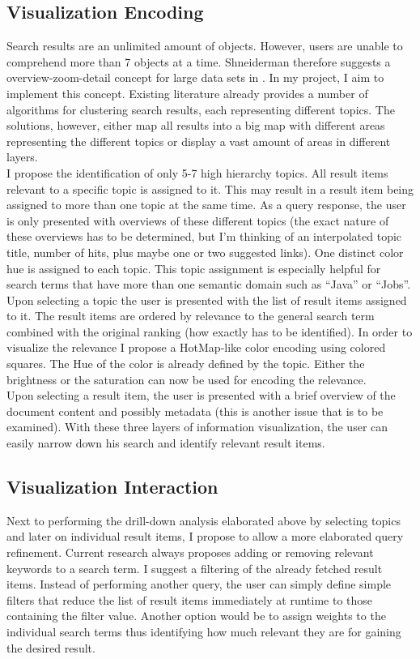 \subsection{Visualization Encoding}
Search results are an unlimited amount of objects. However, users are unable to comprehend more than 7 objects at a time. Shneiderman therefore suggests a overview-zoom-detail concept for large data sets in \cite{Shneiderman1996}. In my project, I aim to implement this concept. Existing literature already provides a number of algorithms for clustering search results, each representing different topics. The solutions, however, either map all results into a big map with different areas representing the different topics or display a vast amount of areas in different layers. \\
I propose the identification of only 5-7 high hierarchy topics. All result items relevant to a specific topic is assigned to it. This may result in a result item being assigned to more than one topic at the same time. As a query response, the user is only presented with overviews of these different topics (the exact nature of these overviews has to be determined, but I'm thinking of an interpolated topic title, number of hits, plus maybe one or two suggested links). One distinct color hue is assigned to each topic. This topic assignment is especially helpful for search terms that have more than one semantic domain such as ``Java'' or ``Jobs''. \\
Upon selecting a topic the user is presented with the list of result items assigned to it. The result items are ordered by relevance to the general search term combined with the original ranking (how exactly has to be identified). In order to visualize the relevance I propose a HotMap-like color encoding using colored squares. The Hue of the color is already defined by the topic. Either the brightness or the saturation can now be used for encoding the relevance. \\
Upon selecting a result item, the user is presented with a brief overview of the document content and possibly metadata (this is another issue that is to be examined). With these three layers of information visualization, the user can easily narrow down his search and identify relevant result items.

\subsection{Visualization Interaction}
Next to performing the drill-down analysis elaborated above by selecting topics and later on individual result items, I propose to allow a more elaborated query refinement. Current research always proposes adding or removing relevant keywords to a search term. I suggest a filtering of the already fetched result items. Instead of performing another query, the user can simply define simple filters that reduce the list of result items immediately at runtime to those containing the filter value. Another option would be to assign weights to the individual search terms thus identifying how much relevant they are for gaining the desired result.

